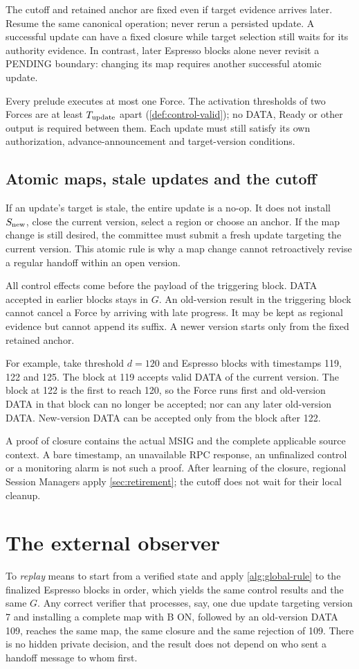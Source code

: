 \documentclass[11pt,a4paper]{article}
\begin{document}
The cutoff and retained anchor are fixed even if target evidence arrives
later. Resume the same canonical operation; never rerun a persisted
update. A successful update can have a fixed closure while target
selection still waits for its authority evidence. In contrast, later
Espresso blocks alone never revisit a PENDING boundary: changing its map
requires another successful atomic update.

Every prelude executes at most one Force. The activation thresholds of
two Forces are at least $T_{\rm update}$ apart
(\cref{def:control-valid}); no DATA, Ready or other output is required
between them.
Each update must still satisfy its own authorization,
advance-announcement and target-version conditions.

\subsection{Atomic maps, stale updates and the cutoff}
If an update's target is stale, the entire update is a no-op. It does not
install $S_{\rm new}$, close the current version, select a region or
choose an anchor. If the map change is still desired, the committee must
submit a fresh update targeting the current version. This atomic rule is
why a map change cannot retroactively revise a regular handoff within an
open version.

All control effects come before the payload of the triggering block.
DATA accepted in earlier blocks stays in $G$. An old-version result in
the triggering block cannot cancel a Force by arriving with late
progress. It may be kept as regional evidence but cannot append its
suffix. A newer version starts only from the fixed retained anchor.

For example, take threshold $d=120$ and Espresso blocks with timestamps
119, 122 and 125. The block at 119 accepts valid DATA of the current
version. The block at 122 is the first to reach 120, so the Force runs
first and old-version DATA in that block can no longer be accepted;
nor can any later old-version DATA. New-version DATA can be accepted only
from the block after 122.

A proof of closure contains the actual MSIG and the complete applicable
source context. A bare timestamp, an unavailable RPC response, an
unfinalized control or a monitoring alarm is not such a proof. After
learning of the closure, regional Session Managers apply
\cref{sec:retirement}; the cutoff does not wait for their local cleanup.

\section{The external observer}
\label{sec:observers}
To \emph{replay} means to start from a verified state and apply
\cref{alg:global-rule} to the finalized Espresso blocks in order, which
yields the same control results and the same $G$. Any correct verifier
that processes, say, one due update targeting version 7 and installing a
complete map with B ON, followed by an old-version DATA 109, reaches the
same map, the same closure and the same rejection of 109. There is no
hidden private decision, and the
result does not depend on who sent a handoff message to whom first.
\end{document}
